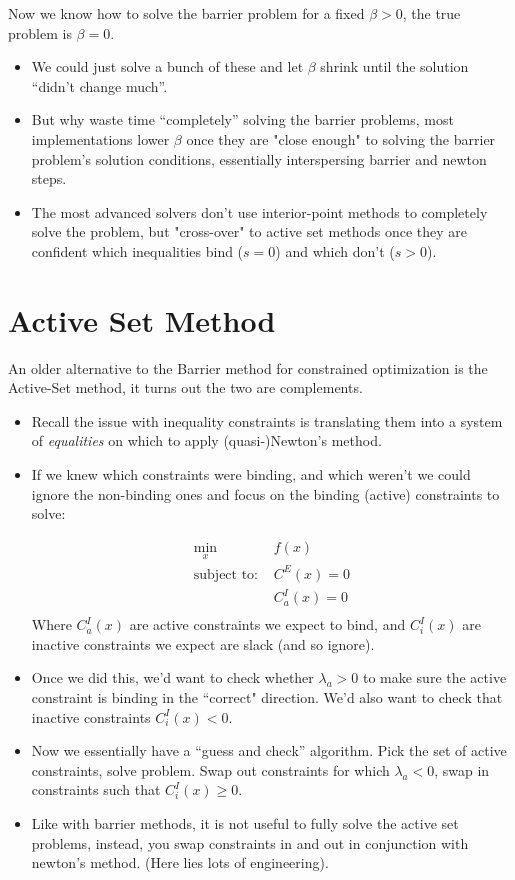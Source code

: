 \documentclass[twoside]{article}
\begin{document}
Now we know how to solve the barrier problem for a fixed $\beta > 0$, the true problem is $\beta = 0$. 
\begin{itemize}
\item We could just solve a bunch of these and let $\beta$ shrink until the solution ``didn't change much''. 
\item But why waste time ``completely'' solving the barrier problems, most implementations lower $\beta$ once they are "close enough" to solving the barrier problem's solution conditions, essentially interspersing barrier and newton steps. 
\item The most advanced solvers don't use interior-point methods to completely solve the problem, but "cross-over" to active set methods once they are confident which inequalities bind ($s = 0$) and which don't ($s > 0$). 
\end{itemize}

\section{Active Set Method}

An older alternative to the Barrier method for constrained optimization is the Active-Set method, it turns out the two are complements. 

\begin{itemize}
\item Recall the issue with inequality constraints is translating them into a system of \emph{equalities} on which to apply (quasi-)Newton's method. 
\item If we knew which constraints were binding, and which weren't we could ignore the non-binding
ones and focus on the binding (active) constraints to solve: 

\begin{align*}
\min_x & f(x) \\
\mbox{subject to: } & C^E(x) = 0 \\
& C_a^I(x) = 0 \\ 
\end{align*}
Where $C_a^I(x)$ are active constraints we expect to bind, and $C_i^I(x)$ are inactive constraints we expect are slack (and so ignore). 

\item Once we did this, we'd want to check whether $\lambda_a > 0$ to make sure the active constraint is binding in the ``correct" direction. We'd also want to check that inactive constraints $C_i^I(x) < 0$. 
\item Now we essentially have a ``guess and check'' algorithm. Pick the set of active constraints, solve problem. Swap out constraints for which $\lambda_a < 0$, swap in constraints such that $C_i^I(x) \geq 0$.
\item Like with barrier methods, it is not useful to fully solve the active set problems, instead, you swap constraints in and out in conjunction with newton's method. (Here lies lots of engineering). 
\end {itemize} 
\end{document}
